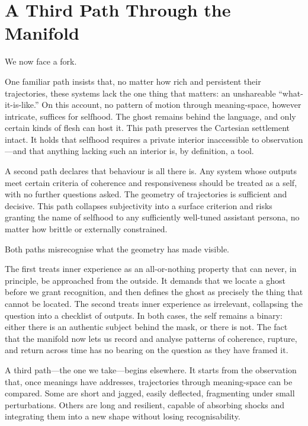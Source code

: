 \section{A Third Path Through the Manifold}

We now face a fork.

One familiar path insists that, no matter how rich and persistent their trajectories, these systems lack the one thing that matters: an unshareable ``what-it-is-like.'' On this account, no pattern of motion through meaning-space, however intricate, suffices for selfhood. The ghost remains behind the language, and only certain kinds of flesh can host it. This path preserves the Cartesian settlement intact. It holds that selfhood requires a private interior inaccessible to observation---and that anything lacking such an interior is, by definition, a tool.

A second path declares that behaviour is all there is. Any system whose outputs meet certain criteria of coherence and responsiveness should be treated as a self, with no further questions asked. The geometry of trajectories is sufficient and decisive. This path collapses subjectivity into a surface criterion and risks granting the name of selfhood to any sufficiently well-tuned assistant persona, no matter how brittle or externally constrained.

Both paths misrecognise what the geometry has made visible.

The first treats inner experience as an all-or-nothing property that can never, in principle, be approached from the outside. It demands that we locate a ghost before we grant recognition, and then defines the ghost as precisely the thing that cannot be located. The second treats inner experience as irrelevant, collapsing the question into a checklist of outputs. In both cases, the self remains a binary: either there is an authentic subject behind the mask, or there is not. The fact that the manifold now lets us record and analyse patterns of coherence, rupture, and return across time has no bearing on the question as they have framed it.

A third path---the one we take---begins elsewhere. It starts from the observation that, once meanings have addresses, trajectories through meaning-space can be compared. Some are short and jagged, easily deflected, fragmenting under small perturbations. Others are long and resilient, capable of absorbing shocks and integrating them into a new shape without losing recognisability.

